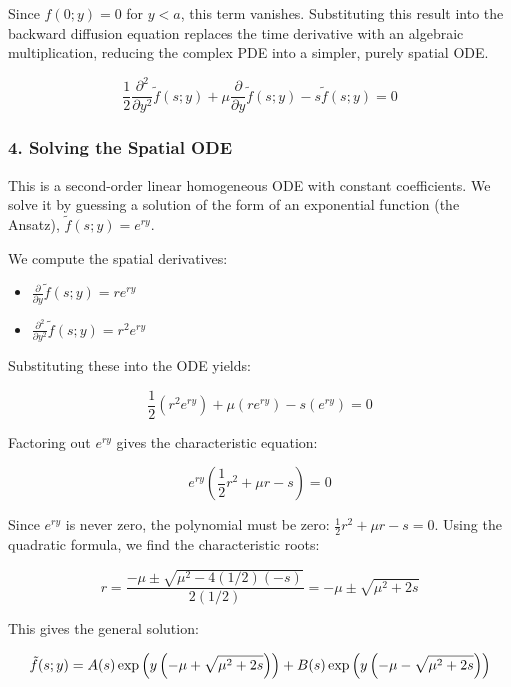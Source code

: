 \documentclass{beamer}
\begin{document}
\begin{frame}
Since $f(0; y) = 0$ for $y < a$, this term vanishes. Substituting this result into the backward diffusion equation replaces the time derivative with an algebraic multiplication, reducing the complex PDE into a simpler, purely spatial ODE.

\[
\frac{1}{2} \frac{\partial^2}{\partial y^2} \tilde{f}(s;y) + \mu \frac{\partial}{\partial y} \tilde{f}(s;y) - s\tilde{f}(s;y) = 0
\]
\end{frame}

\begin{frame}
\frametitle{4. Solving the Spatial ODE}
This is a second-order linear homogeneous ODE with constant coefficients. We solve it by guessing a solution of the form of an exponential function (the Ansatz), $\tilde{f}(s;y) = e^{ry}$.

We compute the spatial derivatives:

\begin{itemize}
  \item $\frac{\partial}{\partial y} \tilde{f}(s;y) = r e^{ry}$
  \item $\frac{\partial^2}{\partial y^2} \tilde{f}(s;y) = r^2 e^{ry}$
\end{itemize}

Substituting these into the ODE yields:

\[
\frac{1}{2}(r^2 e^{ry}) + \mu (r e^{ry}) - s(e^{ry}) = 0
\]

Factoring out $e^{ry}$ gives the characteristic equation:
\end{frame}
\begin{frame}
\[
e^{ry} \left( \frac{1}{2} r^2 + \mu r - s \right) = 0
\]

Since $e^{ry}$ is never zero, the polynomial must be zero: $\frac{1}{2} r^2 + \mu r - s = 0$. Using the quadratic formula, we find the characteristic roots:

\[
r = \frac{-\mu \pm \sqrt{\mu^2 - 4(1/2)(-s)}}{2(1/2)} = -\mu \pm \sqrt{\mu^2 + 2s}
\]

This gives the general solution:

\[
\tilde{f}(s;y) = A(s) \exp \left( y \left( -\mu + \sqrt{\mu^2 + 2s} \right) \right) + 

\hfill B(s) \exp \left( y \left( -\mu - \sqrt{\mu^2 + 2s} \right) \right)
\]
\end{frame}
\end{document}
